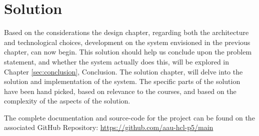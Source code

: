 \chapter{Solution}

Based on the considerations the design chapter, regarding both the architecture and technological choices, development on the system envisioned in the previous chapter, can now begin.
This solution should help us conclude upon the problem statement, and whether the system actually does this, will be explored in Chapter \ref{sec:conclusion}, Conclusion.
The solution chapter, will delve into the solution and implementation of the system.
The specific parts of the solution have been hand picked, based on relevance to the courses, and based on the complexity of the aspects of the solution.

The complete documentation and source-code for the project can be found on the associated GitHub Repository: \url{https://github.com/aau-hcl-p5/main}



%






